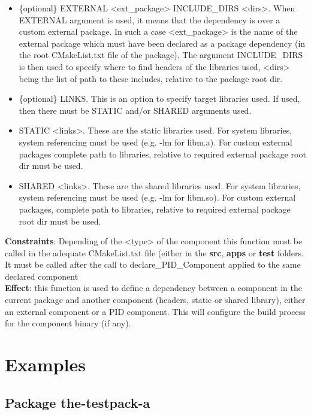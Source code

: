 \documentclass[12pt,a4paper]{article}
\begin{document}
\begin{itemize}
\begin{itemize}
\item \{optional\} EXTERNAL <ext\_package> INCLUDE\_DIRS <dirs>. When EXTERNAL argument is used, it means that the dependency is over a custom external package. In such a case <ext\_package> is the name of the external package which must have been declared as a package dependency (in the root CMakeList.txt file of the package). The argument INCLUDE\_DIRS is then used to specify where to find headers of the libraries used, <dirs> being the list of path to these includes, relative to the package root dir.
\item \{optional\} LINKS. This is an option to specify target libraries used. If used, then there must be STATIC and/or SHARED arguments used.
\item STATIC <links>. These are the static libraries used. For system libraries, system referencing must be used (e.g. -lm for libm.a). For custom external packages complete path to libraries, relative to required external package root dir must be used.
\item SHARED <links>. These are the shared libraries used. For system libraries, system referencing must be used (e.g. -lm for libm.so). For custom external packages, complete path to libraries, relative to required external package root dir must be used.
\end{itemize}
\end{itemize}
\textbf{Constraints}: Depending of the <type> of the component this function must be called in the adequate CMakeList.txt file (either in the \textbf{src}, \textbf{apps} or \textbf{test} folders. It must be called after the call to declare\_PID\_Component applied to the same declared component\\
\textbf{Effect}: this function is used to define a dependency between a component in the current package and another component (headers, static or shared library), either an external component or a PID component. This will configure the build process for the component binary (if any).

\pagebreak

\section{Examples}
\label{sec:Examples}

\subsection{Package the-testpack-a}
\end{document}
